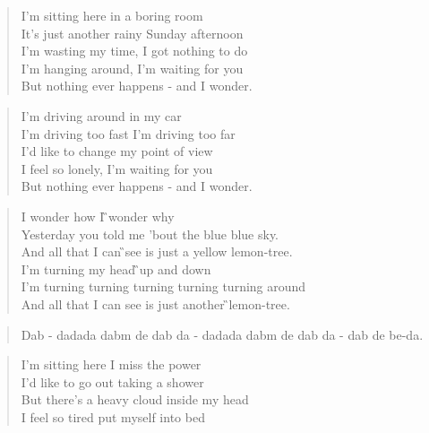 \documentclass[9pt,a4paper,oneside, onecolumn]{article}
\begin{document}
\begin{multicols}{2}
\begin{small}


\begin{verse}
I'm \Am{}sitting here in a \Em{}boring room\\
It's \Am{}just another rainy Sunday \Em{}afternoon\\
I'm \Am{}wasting my time, I got \Em{}nothing to do\\
I'm \Dm{}hanging around, I'm \Em{}waiting for you\\
But \Dm{}nothing ever \Em{}happens - and I \Am{}wonder.\qquad{}\\
\end{verse}
\begin{verse}
I'm driving around in my car\\
I'm driving too fast I'm driving too far\\
I'd like to change my point of view\\
I feel so lonely, I'm waiting for you\\
But nothing ever happens - and I wonder.\\
\end{verse}
\begin{verse}
I \C{}wonder how I \G{}wonder why\\
\Am{}Yesterday you told me 'bout the \Em{}blue blue sky.\\
And \F{}all that I can \G{}see is just a yellow \C{}lemon-tree.\Gs{}\\
I'm \C{}turning my head \G{}up and down\\
I'm \Am{}turning turning turning turning \Em{}turning around\\
And \F{}all that I can \Fisdims{}see is just another \G{}lemon-tree.\Gs{}\\
\end{verse}
\begin{verse}
\Am{}Dab - dada\Em{}da dabm \Am{}de dab da - dada\Em{}da dabm \Dm{}de dab da - dab \Em{}de be-\Am{}da.\qquad{}\qquad{}\\
\end{verse}
\begin{verse}
I'm sitting here I miss the power\\
I'd like to go out taking a shower\\
But there's a heavy cloud inside my head\\
I feel so tired put myself into bed\\

\end{verse}
\end{small}
\end{multicols}
\end{document}
